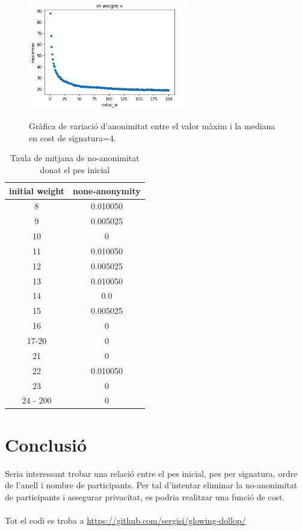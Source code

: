 \documentclass{article}
\begin{document}
\begin{figure}[H]
	\centering
	\includegraphics[width=7cm]{imgs/weight4.png}
	\label{fig:weight4}
	\caption{Gràfica de variació d'anonimitat entre el valor màxim i la mediana en cost de signatura=4.}
\end{figure}
\begin{table}[H]
	\centering
	\begin{tabular}{cc}
		initial weight & none-anonymity\\\hline
		8 & 0.010050 \\
		9 & 0.005025 \\
		10 & 0\\
		11& 0.010050\\
		12&0.005025 \\
		13&0.010050	\\
		14& 0.0 \\
		15&0.005025\\
		16& 0 \\
		17-20 & 0 \\
		21& 0 \\
		22 & 0.010050\\
		23& 0 \\
		24 - 200& 0 \\
	\end{tabular}
\label{tab1}
\caption{Taula de mitjana de no-anonimitat donat el pes inicial}
\end{table}
\section{Conclusió}
Seria interessant trobar una relació entre el pes inicial, pes per signatura, ordre de l'anell i nombre de participants. Per tal d'intentar eliminar la no-anonimitat de participants i assegurar privacitat, es podria realitzar una funció de cost.
\\
\\
Tot el codi es troba a \url{https://github.com/sergisi/glowing-dollop/}
\end{document}
